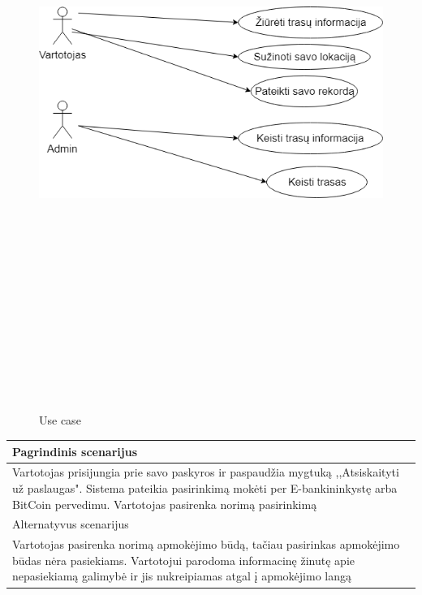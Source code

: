 \documentclass[oneside]{VUMIFPSkursinis}
\begin{document}
\begin{figure}[H]
		\centering	
	\includegraphics[width=18cm,height=20cm,keepaspectratio]{UseCase.png}
	\caption{Use case}
	\label{fig:Use case}
\end{figure}

\begin{table}[htbp]

\begin{tabularx}{1\textwidth}{ |P{17cm}|}  \hline

Pagrindinis scenarijus \\ \hline
Vartotojas prisijungia prie savo paskyros ir paspaudžia mygtuką ,,Atsiskaityti už paslaugas". Sistema pateikia pasirinkimą mokėti per E-bankininkystę arba BitCoin pervedimu. Vartotojas pasirenka norimą pasirinkimą \\ \hline
Alternatyvus scenarijus \\ \hline
Vartotojas pasirenka norimą apmokėjimo būdą, tačiau pasirinkas apmokėjimo būdas nėra pasiekiams. Vartotojui parodoma informacinę žinutę apie nepasiekiamą galimybė ir jis nukreipiamas atgal į apmokėjimo langą \\ \hline





\end{tabularx}

	
\end{table}
\end{document}
